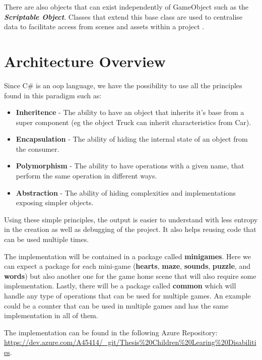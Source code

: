 There are also objects that can exist independently of GameObject such as the \textbf{\textit{Scriptable Object}}. Classes that extend this base class are used to centralise data to facilitate access from scenes and assets within a project \cite{unityDocScriptableObj}.



\newpage

\section{Architecture Overview}
\label{arqOverview}
Since C\# is an \gls{oop} language, we have the possibility to use all the principles found in this paradigm such as:

\begin{itemize}
    \item \textbf{Inheritence} - The ability to have an object that inherits it's base from a super component (eg the object Truck can inherit characteristics from Car).
    \item \textbf{Encapsulation} - The ability of hiding the internal state of an object from the consumer.
    \item \textbf{Polymorphism} - The ability to have operations with a given name, that perform the same operation in different ways.
    \item \textbf{Abstraction} - The ability of hiding complexities and implementations exposing simpler objects.
\end{itemize}

Using these simple principles, the output is easier to understand with less entropy in the creation as well as debugging of the project. It also helps reusing code that can be used multiple times.

The implementation will be contained in a package called \textbf{minigames}. Here we can expect a package for each mini-game (\textbf{hearts}, \textbf{maze}, \textbf{sounds}, \textbf{puzzle}, and \textbf{words}) but also another one for the game home scene that will also require some implementation. Lastly, there will be a package called \textbf{common} which will handle any type of operations that can be used for multiple games. An example could be a counter that can be used in multiple games and has the same implementation in all of them.

The implementation can be found in the following Azure Repository: \url{https://dev.azure.com/A45414/_git/Thesis%20Children%20Learing%20Disabilities}.

